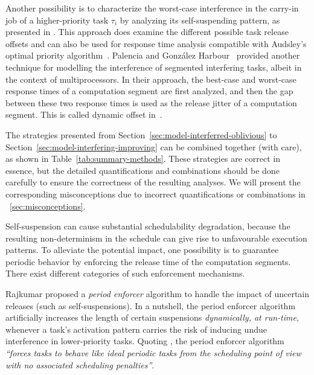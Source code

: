 Another possibility is to characterize the worst-case interference in the carry-in job of a higher-priority task $\tau_i$ by analyzing 
its self-suspending pattern, as presented in \cite{Huang:multiseg}. This approach does examine the different possible task release offsets
and can also be used for response time analysis compatible with Audsley's optimal priority algorithm~\cite{Audsley1991aOPA}.
Palencia and Gonz\'alez Harbour~\cite{PH:rtss98} provided another technique for modelling the interference of segmented interfering tasks, 
albeit in the context of multiprocessors. In their approach, the best-case and worst-case response times of a computation segment are first analyzed, and then the gap between these two response times is used as the release jitter of a computation segment. This is called dynamic offset in~\cite{PH:rtss98}.




The strategies presented from Section~\ref{sec:model-interferred-oblivious} to Section~\ref{sec:model-interfering-improving} can be combined together (with care), as shown in Table~\ref{tab:summary-methods}.  These strategies are correct in essence, but the detailed quantifications and combinations should be done carefully to ensure the correctness of the resulting analyses. We will present the corresponding misconceptions due to incorrect quantifications or combinations in \mysectionref{}~\ref{sec:misconceptions}.

\label{sec:release-enforce}

Self-suspension can cause substantial schedulability degradation, because the resulting non-determinism in the schedule can give rise 
to unfavourable execution patterns. To alleviate the potential impact, one possibility is to guarantee periodic behavior by 
enforcing the release time of the computation segments. There exist different categories of such enforcement mechanisms. 


\label{sec:period-enforce}

Rajkumar \cite{Raj:suspension1991} proposed a \emph{period enforcer} 
algorithm to handle the impact of uncertain releases (such as self-suspensions). In a nutshell, the period enforcer algorithm artificially 
increases the length of certain suspensions \emph{dynamically, at run-time},
whenever a task's activation pattern carries the risk of inducing undue interference in 
lower-priority tasks. Quoting \cite{Raj:suspension1991}, the period enforcer algorithm \textit{``forces tasks to behave like ideal 
periodic tasks from the scheduling point of view with no associated scheduling penalties''}. 

